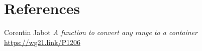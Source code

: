 \documentclass{wg21}
\begin{document}
\section{References}
\renewcommand{\section}[2]{}%
\begin{thebibliography}{9}
	
	Corentin Jabot
	\emph{A function to convert any range to a container}\newline
	\url{https://wg21.link/P1206}

\end{thebibliography}
\end{document}
